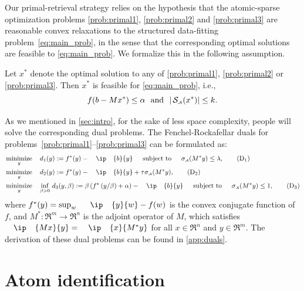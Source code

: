 Our primal-retrieval strategy relies on the hypothesis that the atomic-sparse optimization problems \eqref{prob:primal1}, \eqref{prob:primal2} and \eqref{prob:primal3} are reasonable convex relaxations to the structured data-fitting problem~\eqref{eq:main_prob}, in the sense that the corresponding optimal solutions are feasible to \eqref{eq:main_prob}. We formalize this in the following assumption.

\begin{assumption} \label{ass:blanket}
    Let $x^*$ denote the optimal solution to any of \eqref{prob:primal1}, \eqref{prob:primal2} or \eqref{prob:primal3}. Then $x^*$ is feasible for \eqref{eq:main_prob}, i.e., 
    \[f(b - Mx^*) \leq \alpha \enspace\mathop{\hbox{\rm and}}\enspace |\operatorname{\mathcal{S}_{\scriptscriptstyle\mathcal{A}}}(x^*)| \leq k.\]
 \end{assumption}

As we mentioned in \autoref{sec:intro}, for the sake of less space complexity, people will solve the corresponding dual problems. The Fenchel-Rockafellar duals for problems~\eqref{prob:primal1}--\eqref{prob:primal3} can be formulated as:
\begin{align} 
  & \minimize{y}\enspace d_1(y) := f^*(y) - \ip{b}{y} \enspace\text{subject to}\enspace \sigma\As(M^*y) \leq \lambda, \label{prob:dual1} \tag{D$_1$}\\
  & \minimize{y}\enspace d_2(y) := f^*(y) - \ip{b}{y} + \tau\sigma\As(M^*y), \label{prob:dual2} \tag{D$_2$}\\
  & \minimize{y}\enspace \inf_{\beta > 0} \,d_3(y, \beta)
    := \beta \left(
      f^*\left( y/\beta \right) + \alpha
    \right) - \ip{b}{y} \enspace\text{subject to}\enspace \sigma\As(M^* y) \leq 1, \label{prob:dual3} \tag{D$_3$}
\end{align}
where $f^*(y) = \sup_w \enspace \ip{y}{w} - f(w)$ is the convex conjugate
function of $f$, and $M^*:\Re^m \to \Re^n$ is the adjoint operator of $M$, which satisfies $\ip{Mx}{y} = \ip{x}{M^*y}$ for all $x\in\Re^n$ and $y\in\Re^m$. The derivation of these dual problems can be found in \autoref{app:duals}. 

\section{Atom identification} \label{sec:atom_iden}

